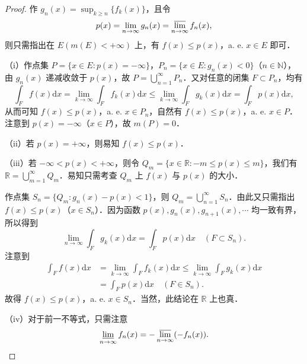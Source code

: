 \documentclass[../../main.tex]{subfiles}%
\begin{document}
\begin{proof}

作 \( g_n(x) = \sup_{k \geqslant n} \{ f_k(x) \} \)，且令
\[
p(x) = \lim_{n \to \infty} g_n(x) = \varlimsup_{n \to \infty} f_n(x),
\]
则只需指出在 \( E(m(E) < +\infty) \) 上，有 \( f(x) \leqslant p(x) \)，a. e. \( x \in E \) 即可．

（i）作点集 \( P = \{ x \in E : p(x) = -\infty \} \)，\( P_n = \{ x \in E : g_n(x) < 0 \} \)（\( n \in \mathbb{N} \)），由 \( g_n(x) \) 递减收敛于 \( p(x) \)，故 \( P = \bigcup_{n=1}^{\infty} P_n \)．又对任意的闭集 \( F \subset P_n \)，均有
\[
\int_F f(x) \mathrm{d}x = \lim_{k \to \infty} \int_F f_k(x) \mathrm{d}x \leqslant \lim_{k \to \infty} \int_F g_k(x) \mathrm{d}x = \int_F p(x) \mathrm{d}x,
\]
从而可知 \( f(x) \leqslant p(x) \)，a. e. \( x \in P_n \)，自然有 \( f(x) \leqslant p(x) \)，a. e. \( x \in P \)．注意到 \( p(x) = -\infty \)（\( x \in P \)），故 \( m(P) = 0 \)．

（ii）若 \( p(x) = +\infty \)，则易知 \( f(x) \leqslant p(x) \)．

（iii）若 \( -\infty < p(x) < +\infty \)，则令 \( Q_m = \{ x \in \mathbb{R} : -m \leqslant p(x) \leqslant m \} \)，我们有 \( \mathbb{R} = \bigcup_{m=1}^{\infty} Q_m \)．易知只需考查 \( Q_m \) 上 \( f(x) \) 与 \( p(x) \) 的大小．

作点集 \( S_n = \{ Q_m : g_n(x) - p(x) < 1 \} \)，则 \( Q_m = \bigcup_{n=1}^{\infty} S_n \)．由此又只需指出 \( f(x) \leqslant p(x) \)（\( x \in S_n \)）．因为函数 \( p(x), g_n(x), g_{n+1}(x), \cdots \) 均一致有界，所以得到
\[
\lim_{n \to \infty} \int_F g_k(x) \mathrm{d}x = \int_F p(x) \mathrm{d}x \quad (F \subset S_n).
\]
注意到
\begin{align*}
\int_F f(x) \mathrm{d}x &= \lim_{k \to \infty} \int_F f_k(x) \mathrm{d}x \leqslant \lim_{k \to \infty} \int_F g_k(x) \mathrm{d}x \\
&= \int_F p(x) \mathrm{d}x \quad (F \in S_n).
\end{align*}
故得 \( f(x) \leqslant p(x) \)，a. e. \( x \in S_n \)．当然，此结论在 \( \mathbb{R} \) 上也真．

（iv）对于前一不等式，只需注意
\[
\varliminf_{n \to \infty} f_n(x) = -\varlimsup_{n \to \infty} (-f_n(x)).
\]

\end{proof}
\end{document}

